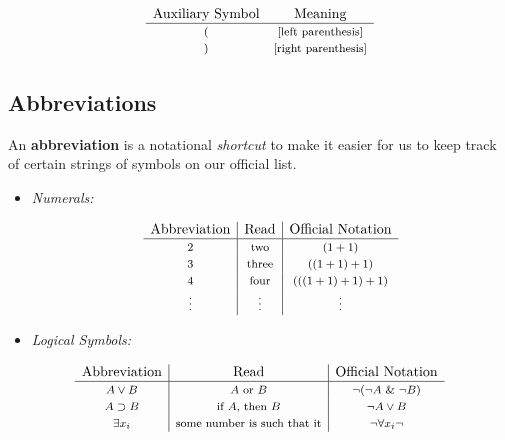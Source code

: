 \documentclass[12pt]{extarticle}
\begin{document}
\[
\begin{array}{cc}
 \text{{Auxiliary Symbol}} & \text{{Meaning}}  \\
\hline
 \text{\footnotesize $($} &\text{\footnotesize [left parenthesis]}\\   
  \text{\footnotesize $)$} &\text{\footnotesize [right parenthesis]}
\end{array}
\]

\vspace{2mm}




\subsection{Abbreviations}

An \textbf{abbreviation} is a notational \textit{shortcut} to make it easier for us to keep track of certain strings of symbols on our official list. 

\begin{itemize}

\item \emph{Numerals:}

\[
\begin{array}{c|c|c}
\text{{Abbreviation}}  & \text{{Read}} & \text{{Official Notation}}     \\
\hline
\text{\footnotesize  $2$} & \text{\footnotesize two} & \text{\footnotesize $(1+1)$}   \\
\text{\footnotesize  $3$} & \text{\footnotesize three} & \text{\footnotesize $((1+1) +1)$}  \\
\text{\footnotesize $4$} & \text{\footnotesize four} & \text{\footnotesize $(((1+1) +1) + 1)$}   \\ 
\text{\footnotesize \vdots} & \text{\footnotesize \vdots} & \text{\footnotesize \vdots} \\
\end{array}
\]
\vspace{2mm}

 \item \emph{Logical Symbols:}

\end{itemize}

\vspace{-4mm}

\[
\begin{array}{c|c|c}
 \text{{Abbreviation}}  &\text{{Read}} &\text{{Official Notation}}   \\
\hline
\text{\footnotesize $A \vee B$}  & \text{\footnotesize  $A$ or $B$}  & \text{\footnotesize  $\neg(\neg A  \ \& \ \neg B)$} \\
\text{\footnotesize $A \supset B$}  & \text{\footnotesize  if $A$, then $B$}  & \text{\footnotesize  $\neg A  \vee B$} \\
\text{\footnotesize $\exists x_i$}  & \text{\footnotesize  some number is such that it}  & \text{\footnotesize  $\neg \forall x_i \neg$} \\
\end{array}
\]
\end{document}
